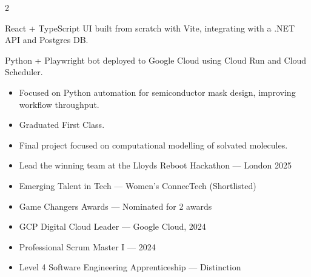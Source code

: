 \documentclass[10pt,a4paper,withhyper]{altacv}
\begin{document}
\begin{paracol}{2}
\divider

React + TypeScript UI built from scratch with Vite, integrating with a .NET API and Postgres DB.

\divider

Python + Playwright bot deployed to Google Cloud using Cloud Run and Cloud Scheduler.




\switchcolumn



\begin{itemize}
  \item Focused on Python automation for semiconductor mask design, improving workflow throughput.
\end{itemize}

\divider

\begin{itemize}
  \item Graduated First Class.
  \item Final project focused on computational modelling of solvated molecules.
\end{itemize}

\begin{itemize}
  \item Lead the winning team at the Lloyds Reboot Hackathon — London 2025
  \item Emerging Talent in Tech — Women's ConnecTech (Shortlisted)
  \item Game Changers Awards — Nominated for 2 awards
\end{itemize}

\begin{itemize}
  \item GCP Digital Cloud Leader — Google Cloud, 2024
  \item Professional Scrum Master I — 2024
  \item Level 4 Software Engineering Apprenticeship — Distinction
\end{itemize}


   
   
   
 

\end{paracol}
\end{document}
